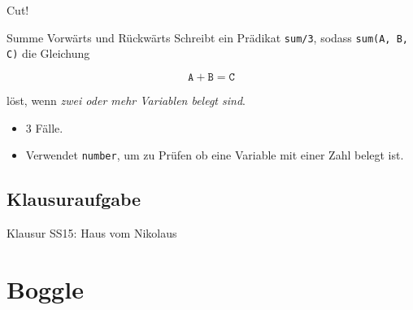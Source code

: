 \documentclass{beamer}
\begin{document}
\begin{frame}{Cut!}
\end{frame}

\begin{frame}{Summe Vorwärts und Rückwärts}
    Schreibt ein Prädikat \texttt{sum/3}, sodass \texttt{sum(A, B, C)} die Gleichung

    \begin{equation*}
        \texttt{A} + \texttt{B} = \texttt{C}
    \end{equation*}

    löst, wenn \emph{zwei oder mehr Variablen belegt sind}.

    \begin{itemize}
        \item 3 Fälle.
        \item Verwendet \texttt{number}, um zu Prüfen ob eine Variable mit einer Zahl belegt ist.
    \end{itemize}
\end{frame}

\subsection{Klausuraufgabe}

\begin{frame}{Klausur SS15: Haus vom Nikolaus}
\end{frame}

\section{Boggle}
\end{document}
